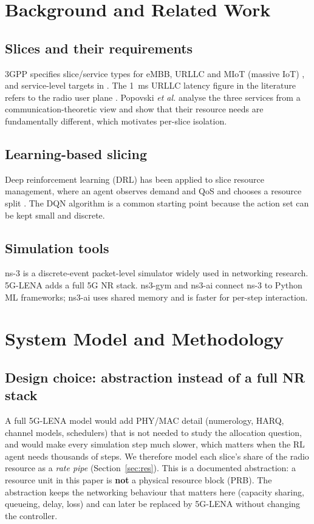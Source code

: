 \documentclass[conference]{IEEEtran}
\begin{document}
\section{Background and Related Work}
\subsection{Slices and their requirements}
3GPP specifies slice/service types for eMBB, URLLC and MIoT (massive IoT) \cite{ts23501}, and service-level targets in \cite{ts22261}. The 1~ms URLLC latency figure in the literature refers to the radio user plane \cite{itu2083}. Popovski \emph{et al.} \cite{popovski2018} analyse the three services from a communication-theoretic view and show that their resource needs are fundamentally different, which motivates per-slice isolation.

\subsection{Learning-based slicing}
Deep reinforcement learning (DRL) has been applied to slice resource management, where an agent observes demand and QoS and chooses a resource split \cite{li2018}. The DQN algorithm \cite{mnih2015} is a common starting point because the action set can be kept small and discrete.

\subsection{Simulation tools}
ns-3 \cite{ns3} is a discrete-event packet-level simulator widely used in networking research. 5G-LENA \cite{lena2019} adds a full 5G NR stack. ns3-gym \cite{ns3gym} and ns3-ai \cite{ns3ai} connect ns-3 to Python ML frameworks; ns3-ai uses shared memory and is faster for per-step interaction.

\section{System Model and Methodology}

\subsection{Design choice: abstraction instead of a full NR stack}
A full 5G-LENA model would add PHY/MAC detail (numerology, HARQ, channel models, schedulers) that is not needed to study the allocation question, and would make every simulation step much slower, which matters when the RL agent needs thousands of steps. We therefore model each slice's share of the radio resource as a \emph{rate pipe} (Section~\ref{sec:res}). This is a documented abstraction: a resource unit in this paper is \textbf{not} a physical resource block (PRB). The abstraction keeps the networking behaviour that matters here (capacity sharing, queueing, delay, loss) and can later be replaced by 5G-LENA without changing the controller.
\end{document}
